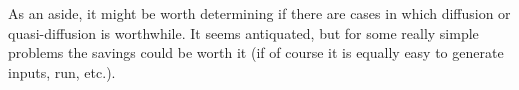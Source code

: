 \documentclass[12pt,twoside]{article}
\begin{document}
As an aside, it might be worth determining if there are cases in which diffusion or quasi-diffusion is worthwhile. It seems antiquated, but for some really simple problems the savings could be worth it (if of course it is equally easy to generate inputs, run, etc.). 


\newpage

\singlespacing


%

\end{document}

